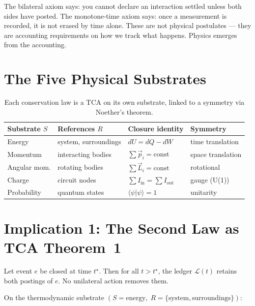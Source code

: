 \documentclass[11pt]{article}
\begin{document}
The bilateral axiom says: you cannot declare an interaction settled
unless both sides have posted. The monotone-time axiom says: once
a measurement is recorded, it is not erased by time alone. These
are not physical postulates --- they are accounting requirements on
how we track what happens. Physics emerges from the accounting.

\section{The Five Physical Substrates}

\begin{table}[h]
\centering
\begin{tabular}{@{}llll@{}}
\toprule
\textbf{Substrate $S$} & \textbf{References $R$} & \textbf{Closure identity} & \textbf{Symmetry} \\
\midrule
Energy     & system, surroundings & $dU = dQ - dW$ & time translation \\
Momentum   & interacting bodies & $\sum \vec{p}_i = \text{const}$ & space translation \\
Angular mom.& rotating bodies & $\sum \vec{L}_i = \text{const}$ & rotational \\
Charge     & circuit nodes & $\sum I_{\text{in}} = \sum I_{\text{out}}$ & gauge (U(1)) \\
Probability & quantum states & $\langle \psi | \psi \rangle = 1$ & unitarity \\
\bottomrule
\end{tabular}
\caption{Each conservation law is a TCA on its own substrate, linked
to a symmetry via Noether's theorem.}
\end{table}

\section{Implication 1: The Second Law as TCA Theorem~1}

\begin{theorem}
Let event $e$ be closed at time $t^\star$. Then for all $t > t^\star$,
the ledger $\mathcal{L}(t)$ retains both postings of $e$. No
unilateral action removes them.
\end{theorem}

On the thermodynamic substrate $(S = \text{energy},\;
R = \{\text{system},\text{surroundings}\})$:
\end{document}
